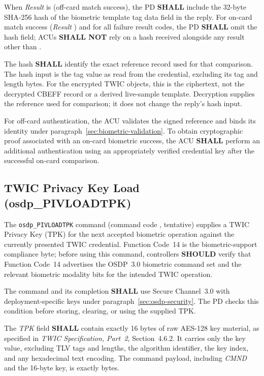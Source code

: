 When \emph{Result} is  (off-card match success), the PD \textbf{SHALL} include the 32-byte SHA-256 hash of the biometric template tag  data field in the reply. For on-card match success (\emph{Result} ) and for all failure result codes, the PD \textbf{SHALL} omit the hash field; ACUs \textbf{SHALL NOT} rely on a hash received alongside any result other than .

The hash \textbf{SHALL} identify the exact reference record used for that comparison.
The hash input is the tag  value as read from the credential,
excluding its tag and length bytes. For the encrypted TWIC objects, this is
the ciphertext, not the decrypted CBEFF record or a derived live-sample template.
Decryption supplies the reference used for comparison; it does not change the
reply's hash input.

For off-card authentication, the ACU validates the signed reference and binds
its identity under paragraph~\ref{sec:biometric-validation}. To obtain cryptographic
proof associated with an on-card biometric success, the ACU \textbf{SHALL} perform
an additional authentication using an appropriately verified credential key after
the successful on-card comparison.



\subsection{TWIC Privacy Key Load (osdp\_PIVLOADTPK)}

The \texttt{osdp\_PIVLOADTPK} command (command code , tentative) supplies a TWIC Privacy Key (TPK) for the next accepted biometric operation against the currently presented TWIC credential. Function Code~14 is the biometric-support compliance byte; before using this command, controllers \textbf{SHOULD} verify that Function Code~14 advertises the OSDP~3.0 biometric command set and the relevant biometric modality bits for the intended TWIC operation.



The command and its completion \textbf{SHALL} use Secure Channel~3.0 with
deployment-specific keys under paragraph~\ref{sec:osdp-security}. The PD checks
this condition before storing, clearing, or using the supplied TPK.

The \emph{TPK} field \textbf{SHALL} contain exactly 16 bytes of raw AES-128 key
material, as specified in \emph{TWIC Specification, Part~2}, Section~4.6.2.
It carries only the key value, excluding TLV tags and lengths, the algorithm
identifier, the key index, and any hexadecimal text encoding. The command payload,
including \emph{CMND} and the 16-byte key, is exactly  bytes.

